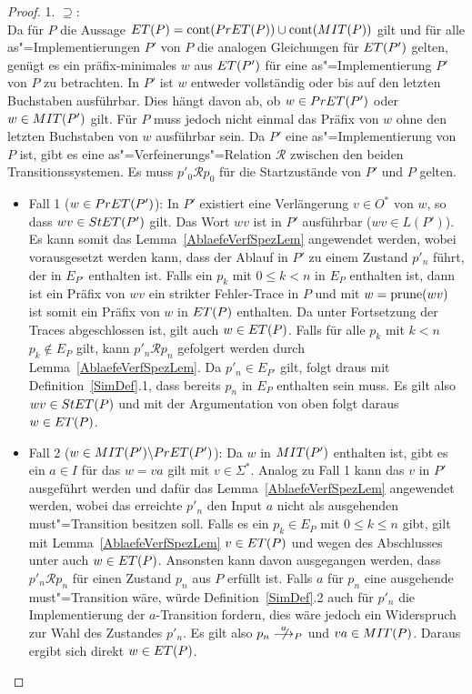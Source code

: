\begin{proof}
  1. \glqq$\supseteq$\grqq{}:\\
  Da für $P$ die Aussage $ET (P) = \mathrm{cont} (PrET (P)) \cup \mathrm{cont} (MIT (P))$
  gilt und für alle as"=Implementierungen $P'$ von $P$ die analogen Gleichungen
  für $ET (P')$ gelten, genügt es ein präfix-minimales $w$ aus $ET (P')$ für
  eine as"=Implementierung $P'$ von $P$ zu betrachten. In $P'$ ist $w$ entweder
  vollständig oder bis auf den letzten Buchstaben ausführbar. Dies hängt davon
  ab, ob $w\in PrET (P')$ oder $w\in MIT (P')$ gilt. Für $P$ muss jedoch
  nicht einmal das Präfix von $w$ ohne den letzten Buchstaben von $w$
  ausführbar sein. Da $P'$ eine as"=Implementierung von $P$ ist, gibt es eine
  as"=Verfeinerungs"=Relation $\mathcal{R}$ zwischen den beiden
  Transitionssystemen. Es muss $p'_0\mathcal{R}p_0$ für die Startzustände von
  $P'$ und $P$ gelten.
  \begin{itemize}
    \item Fall 1 ($w\in PrET (P')$): In $P'$ existiert eine Verlängerung $v\in
      O^*$ von $w$, so dass $wv\in StET (P')$ gilt. Das Wort $wv$ ist in $P'$
      ausführbar ($wv\in L(P')$). Es kann somit das
      Lemma~\ref{AblaefeVerfSpezLem} angewendet werden, wobei
      vorausgesetzt werden kann, dass der Ablauf in $P'$ zu einem Zustand
      $p'_n$ führt, der in $E_{P'}$ enthalten ist. Falls ein $p_k$ mit $0\leq k
      < n$ in $E_P$ enthalten ist, dann ist ein Präfix von $wv$ ein strikter
      Fehler-Trace in $P$ und mit $w=\mathrm{prune}(wv)$ ist somit ein Präfix von $w$
      in $ET (P)$ enthalten. Da \ET{} unter Fortsetzung der Traces
      abgeschlossen ist, gilt auch $w\in ET (P)$. Falls für alle $p_k$ mit $k
      < n$ $p_k\notin E_P$ gilt, kann $p'_n \mathcal{R} p_n$ gefolgert werden
      durch Lemma~\ref{AblaefeVerfSpezLem}. Da $p'_n\in E_{P'}$ gilt, folgt
      draus mit Definition~\ref{SimDef}.1, dass bereits $p_n$ in $E_P$
      enthalten sein muss. Es gilt also $wv\in StET (P)$ und mit der
      Argumentation von oben folgt daraus $w\in ET (P)$.
    \item Fall 2 ($w\in MIT (P')\backslash PrET (P')$): Da $w$ in $MIT (P')$
      enthalten ist, gibt es ein $a\in I$ für das $w=va$ gilt mit $v\in\Sigma
      ^*$. Analog zu Fall 1 kann das $v$ in $P'$ ausgeführt werden und dafür
      das Lemma~\ref{AblaefeVerfSpezLem} angewendet werden, wobei das
      erreichte $p'_n$ den Input $a$ nicht als ausgehenden must"=Transition
      besitzen soll. Falls es ein $p_k\in E_P$ mit $0\leq k \leq n$ gibt, gilt
      mit Lemma~\ref{AblaefeVerfSpezLem} $v\in ET (P)$ und wegen des
      Abschlusses unter \cont{} auch $w\in ET (P)$. Ansonsten kann davon
      ausgegangen werden, dass $p'_n \mathcal{R} p_n$ für einen Zustand $p_n$
      aus $P$ erfüllt ist. Falls $a$ für $p_n$ eine ausgehende must"=Transition
      wäre, würde Definition~\ref{SimDef}.2 auch für $p'_n$ die Implementierung
      der $a$-Transition fordern, dies wäre jedoch ein Widerspruch zur Wahl des
      Zustandes $p'_n$. Es gilt also $p_n\nmust[a]_P$ und $va\in MIT (P)$.
      Daraus ergibt sich direkt $w\in ET (P)$.
  \end{itemize}


\end{proof}

